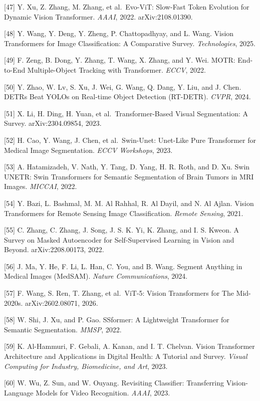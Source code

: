 {[}47{]} Y. Xu, Z. Zhang, M. Zhang, et al.~Evo-ViT: Slow-Fast Token Evolution for Dynamic Vision Transformer. \emph{AAAI}, 2022. arXiv:2108.01390.

{[}48{]} Y. Wang, Y. Deng, Y. Zheng, P. Chattopadhyay, and L. Wang. Vision Transformers for Image Classification: A Comparative Survey. \emph{Technologies}, 2025.

{[}49{]} F. Zeng, B. Dong, Y. Zhang, T. Wang, X. Zhang, and Y. Wei. MOTR: End-to-End Multiple-Object Tracking with Transformer. \emph{ECCV}, 2022.

{[}50{]} Y. Zhao, W. Lv, S. Xu, J. Wei, G. Wang, Q. Dang, Y. Liu, and J. Chen. DETRs Beat YOLOs on Real-time Object Detection (RT-DETR). \emph{CVPR}, 2024.

{[}51{]} X. Li, H. Ding, H. Yuan, et al.~Transformer-Based Visual Segmentation: A Survey. arXiv:2304.09854, 2023.

{[}52{]} H. Cao, Y. Wang, J. Chen, et al.~Swin-Unet: Unet-Like Pure Transformer for Medical Image Segmentation. \emph{ECCV Workshops}, 2023.

{[}53{]} A. Hatamizadeh, V. Nath, Y. Tang, D. Yang, H. R. Roth, and D. Xu. Swin UNETR: Swin Transformers for Semantic Segmentation of Brain Tumors in MRI Images. \emph{MICCAI}, 2022.

{[}54{]} Y. Bazi, L. Bashmal, M. M. Al Rahhal, R. Al Dayil, and N. Al Ajlan. Vision Transformers for Remote Sensing Image Classification. \emph{Remote Sensing}, 2021.

{[}55{]} C. Zhang, C. Zhang, J. Song, J. S. K. Yi, K. Zhang, and I. S. Kweon. A Survey on Masked Autoencoder for Self-Supervised Learning in Vision and Beyond. arXiv:2208.00173, 2022.

{[}56{]} J. Ma, Y. He, F. Li, L. Han, C. You, and B. Wang. Segment Anything in Medical Images (MedSAM). \emph{Nature Communications}, 2024.

{[}57{]} F. Wang, S. Ren, T. Zhang, et al.~ViT-5: Vision Transformers for The Mid-2020s. arXiv:2602.08071, 2026.

{[}58{]} W. Shi, J. Xu, and P. Gao. SSformer: A Lightweight Transformer for Semantic Segmentation. \emph{MMSP}, 2022.

{[}59{]} K. Al-Hammuri, F. Gebali, A. Kanan, and I. T. Chelvan. Vision Transformer Architecture and Applications in Digital Health: A Tutorial and Survey. \emph{Visual Computing for Industry, Biomedicine, and Art}, 2023.

{[}60{]} W. Wu, Z. Sun, and W. Ouyang. Revisiting Classifier: Transferring Vision-Language Models for Video Recognition. \emph{AAAI}, 2023.

